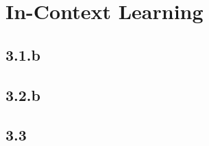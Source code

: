 \documentclass{article}
\begin{document}
\subsection{}


\section{In-Context Learning}
\subsection*{3.1.b}

\subsection*{3.2.b}

\subsection*{3.3}



\section{}
\subsection{}

\subsection{}

\subsection{}


% 
% 
\end{document}
